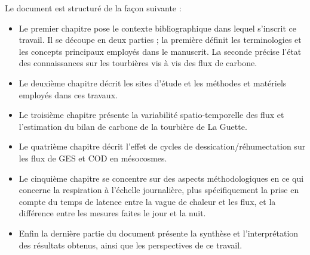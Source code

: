 Le document est structuré de la façon suivante :
\begin{itemize}
\item Le premier chapitre pose le contexte bibliographique dans lequel s'inscrit ce travail.
Il se découpe en deux parties ; la première définit les terminologies et les concepts principaux employés dans le manuscrit.
La seconde précise l'état des connaissances sur les tourbières vis à vis des flux de carbone.
\item Le deuxième chapitre décrit les sites d'étude et les méthodes et matériels employés dans ces travaux.
\item Le troisième chapitre présente la variabilité spatio-temporelle des flux et l'estimation du bilan de carbone de la tourbière de La Guette.
\item Le quatrième chapitre décrit l'effet de cycles de dessication/réhumectation sur les flux de GES et COD en mésocosmes.
\item Le cinquième chapitre se concentre sur des aspects méthodologiques en ce qui concerne la respiration à l'échelle journalière, plus spécifiquement la prise en compte du temps de latence entre la vague de chaleur et les flux, et la différence entre les mesures faites le jour et la nuit.
\item Enfin la dernière partie du document présente la synthèse et l'interprétation des résultats obtenus, ainsi que les perspectives de ce travail.
\end{itemize}